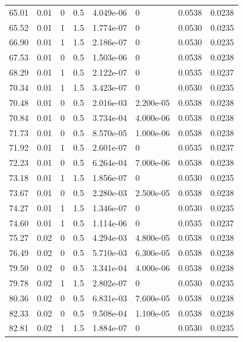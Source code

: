 \documentclass[preview]{standalone}
\begin{document}
{{{\begin{tabular}{L{1.2cm}C{1.2cm} C{0.3cm}C{0.5cm} C{1.4cm}C{1.4cm} C{1.4cm}C{1.4cm}}
  65.01  &  0.01  & 0     & 0.5 &  4.049e-06  & 0  & 0.0538 &  0.0238   \\ 
  65.52  &  0.01  & 1     & 1.5 &  1.774e-07  & 0  & 0.0530 &  0.0235   \\ 
  66.90  &  0.01  & 1     & 1.5 &  2.186e-07  & 0  & 0.0530 &  0.0235   \\ 
  67.53  &  0.01  & 0     & 0.5 &  1.503e-06  & 0  & 0.0538 &  0.0238   \\ 
  68.29  &  0.01  & 1     & 0.5 &  2.122e-07  & 0  & 0.0535 &  0.0237   \\ 
  70.34  &  0.01  & 1     & 1.5 &  3.423e-07  & 0  & 0.0530 &  0.0235   \\ 
  70.48  &  0.01  & 0     & 0.5 &  2.016e-03  & 2.200e-05  & 0.0538 &  0.0238   \\ 
  70.84  &  0.01  & 0     & 0.5 &  3.734e-04  & 4.000e-06  & 0.0538 &  0.0238   \\ 
  71.73  &  0.01  & 0     & 0.5 &  8.570e-05  & 1.000e-06  & 0.0538 &  0.0238   \\ 
  71.92  &  0.01  & 1     & 0.5 &  2.601e-07  & 0  & 0.0535 &  0.0237   \\ 
  72.23  &  0.01  & 0     & 0.5 &  6.264e-04  & 7.000e-06  & 0.0538 &  0.0238   \\ 
  73.18  &  0.01  & 1     & 1.5 &  1.856e-07  & 0  & 0.0530 &  0.0235   \\ 
  73.67  &  0.01  & 0     & 0.5 &  2.280e-03  & 2.500e-05  & 0.0538 &  0.0238   \\ 
  74.27  &  0.01  & 1     & 1.5 &  1.346e-07  & 0  & 0.0530 &  0.0235   \\ 
  74.60  &  0.01  & 1     & 0.5 &  1.114e-06  & 0  & 0.0535 &  0.0237   \\ 
  75.27  &  0.02  & 0     & 0.5 &  4.294e-03  & 4.800e-05  & 0.0538 &  0.0238   \\ 
  76.49  &  0.02  & 0     & 0.5 &  5.710e-03  & 6.300e-05  & 0.0538 &  0.0238   \\ 
  79.50  &  0.02  & 0     & 0.5 &  3.341e-04  & 4.000e-06  & 0.0538 &  0.0238   \\ 
  79.78  &  0.02  & 1     & 1.5 &  2.802e-07  & 0  & 0.0530 &  0.0235   \\ 
  80.36  &  0.02  & 0     & 0.5 &  6.831e-03  & 7.600e-05  & 0.0538 &  0.0238   \\ 
  82.33  &  0.02  & 0     & 0.5 &  9.508e-04  & 1.100e-05  & 0.0538 &  0.0238   \\ 
  82.81  &  0.02  & 1     & 1.5 &  1.884e-07  & 0  & 0.0530 &  0.0235   \\ 

\end{tabular}}}}
\end{document}
